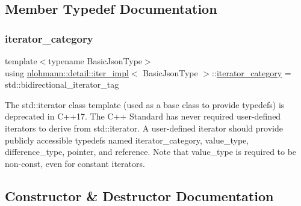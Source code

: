 \subsection{Member Typedef Documentation}
\mbox{\label{classnlohmann_1_1detail_1_1iter__impl_ad9e091f5c70b34b5b1abc1ab15fd9106}} 
\subsubsection{\texorpdfstring{iterator\+\_\+category}{iterator\_category}}
{\footnotesize\ttfamily template$<$typename Basic\+Json\+Type$>$ \\
using \mbox{\hyperlink{classnlohmann_1_1detail_1_1iter__impl}{nlohmann\+::detail\+::iter\+\_\+impl}}$<$ Basic\+Json\+Type $>$\+::\mbox{\hyperlink{classnlohmann_1_1detail_1_1iter__impl_ad9e091f5c70b34b5b1abc1ab15fd9106}{iterator\+\_\+category}} =  std\+::bidirectional\+\_\+iterator\+\_\+tag}

The std\+::iterator class template (used as a base class to provide typedefs) is deprecated in C++17. The C++ Standard has never required user-\/defined iterators to derive from std\+::iterator. A user-\/defined iterator should provide publicly accessible typedefs named iterator\+\_\+category, value\+\_\+type, difference\+\_\+type, pointer, and reference. Note that value\+\_\+type is required to be non-\/const, even for constant iterators. 

\subsection{Constructor \& Destructor Documentation}
\mbox{\label{classnlohmann_1_1detail_1_1iter__impl_a19aa457f9c4af1b7e3af59839132cc5c}} 
